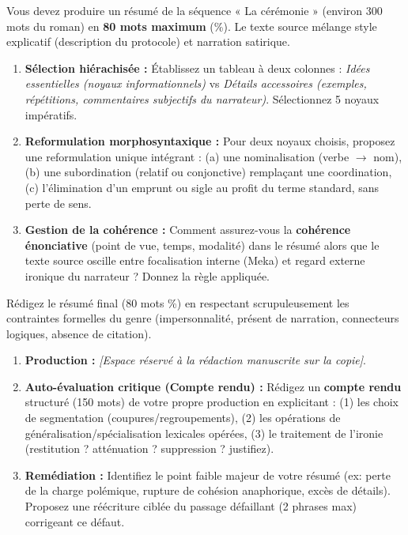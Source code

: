 \documentclass[11pt]{article}
\begin{document}
\begin{exercice}
Vous devez produire un résumé de la séquence « La cérémonie » (environ 300 mots du roman) en \textbf{80 mots maximum} (\%). Le texte source mélange style explicatif (description du protocole) et narration satirique.
\begin{enumerate}
    \item \textbf{Sélection hiérachisée :} Établissez un tableau à deux colonnes : \textit{Idées essentielles (noyaux informationnels)} vs \textit{Détails accessoires (exemples, répétitions, commentaires subjectifs du narrateur)}. Sélectionnez 5 noyaux impératifs.
    \item \textbf{Reformulation morphosyntaxique :} Pour deux noyaux choisis, proposez une reformulation unique intégrant : (a) une nominalisation (verbe $\to$ nom), (b) une subordination (relatif ou conjonctive) remplaçant une coordination, (c) l'élimination d'un emprunt ou sigle au profit du terme standard, sans perte de sens.
    \item \textbf{Gestion de la cohérence :} Comment assurez-vous la \textbf{cohérence énonciative} (point de vue, temps, modalité) dans le résumé alors que le texte source oscille entre focalisation interne (Meka) et regard externe ironique du narrateur ? Donnez la règle appliquée.
\end{enumerate}
\end{exercice}

\begin{exercice}
Rédigez le résumé final (80 mots \%) en respectant scrupuleusement les contraintes formelles du genre (impersonnalité, présent de narration, connecteurs logiques, absence de citation).
\begin{enumerate}
    \item \textbf{Production :} \textit{[Espace réservé à la rédaction manuscrite sur la copie]}.
    \item \textbf{Auto-évaluation critique (Compte rendu) :} Rédigez un \textbf{compte rendu} structuré (150 mots) de votre propre production en explicitant : (1) les choix de segmentation (coupures/regroupements), (2) les opérations de généralisation/spécialisation lexicales opérées, (3) le traitement de l'ironie (restitution ? atténuation ? suppression ? justifiez).
    \item \textbf{Remédiation :} Identifiez le point faible majeur de votre résumé (ex: perte de la charge polémique, rupture de cohésion anaphorique, excès de détails). Proposez une réécriture ciblée du passage défaillant (2 phrases max) corrigeant ce défaut.
\end{enumerate}
\end{exercice}
\end{document}
